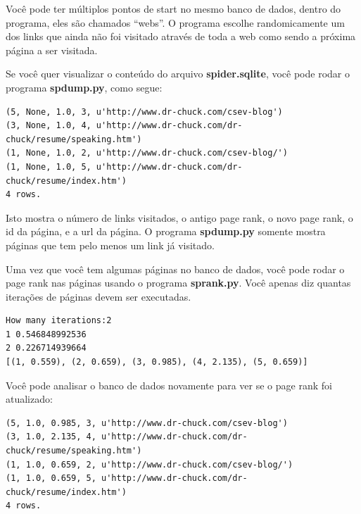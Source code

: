 Você pode ter múltiplos pontos de start no mesmo banco de dados, dentro
do programa, eles são chamados ``webs''. O programa escolhe randomicamente
um dos links que ainda não foi visitado através de toda a web como sendo
a próxima página a ser visitada.

Se você quer visualizar o conteúdo do arquivo {\bf spider.sqlite}, você pode
rodar o programa {\bf spdump.py}, como segue:

\beforeverb
\begin{verbatim}
(5, None, 1.0, 3, u'http://www.dr-chuck.com/csev-blog')
(3, None, 1.0, 4, u'http://www.dr-chuck.com/dr-chuck/resume/speaking.htm')
(1, None, 1.0, 2, u'http://www.dr-chuck.com/csev-blog/')
(1, None, 1.0, 5, u'http://www.dr-chuck.com/dr-chuck/resume/index.htm')
4 rows.
\end{verbatim}
\afterverb
%

Isto mostra o número de links visitados, o antigo page rank, o novo page
rank, o id da página, e a url da página. O programa {\bf spdump.py} somente
mostra páginas que tem pelo menos um link já visitado.

Uma vez que você tem algumas páginas no banco de dados, você pode rodar o page 
rank nas páginas usando o programa {\bf sprank.py}. Você apenas diz quantas
iterações de páginas devem ser executadas.

\beforeverb
\begin{verbatim}
How many iterations:2
1 0.546848992536
2 0.226714939664
[(1, 0.559), (2, 0.659), (3, 0.985), (4, 2.135), (5, 0.659)]
\end{verbatim}
\afterverb
%
Você pode analisar o banco de dados novamente para ver se o page rank foi
atualizado:

\beforeverb
\begin{verbatim}
(5, 1.0, 0.985, 3, u'http://www.dr-chuck.com/csev-blog')
(3, 1.0, 2.135, 4, u'http://www.dr-chuck.com/dr-chuck/resume/speaking.htm')
(1, 1.0, 0.659, 2, u'http://www.dr-chuck.com/csev-blog/')
(1, 1.0, 0.659, 5, u'http://www.dr-chuck.com/dr-chuck/resume/index.htm')
4 rows.
\end{verbatim}
\afterverb
%

